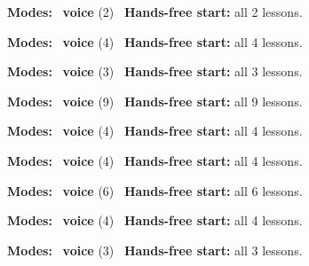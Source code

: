 \expandafter\def\csname hlchaptermodality15\endcsname{%
  {\small\noindent
    \textbf{Modes:} \hlvoicesign{}~\textbf{voice} (2)\quad
    \hlvoicesign{}~\textbf{Hands-free start:} all 2 lessons.%
    \par}\medskip
}

\expandafter\def\csname hlchaptermodality16\endcsname{%
  {\small\noindent
    \textbf{Modes:} \hlvoicesign{}~\textbf{voice} (4)\quad
    \hlvoicesign{}~\textbf{Hands-free start:} all 4 lessons.%
    \par}\medskip
}

\expandafter\def\csname hlchaptermodality17\endcsname{%
  {\small\noindent
    \textbf{Modes:} \hlvoicesign{}~\textbf{voice} (3)\quad
    \hlvoicesign{}~\textbf{Hands-free start:} all 3 lessons.%
    \par}\medskip
}

\expandafter\def\csname hlchaptermodality18\endcsname{%
  {\small\noindent
    \textbf{Modes:} \hlvoicesign{}~\textbf{voice} (9)\quad
    \hlvoicesign{}~\textbf{Hands-free start:} all 9 lessons.%
    \par}\medskip
}

\expandafter\def\csname hlchaptermodality19\endcsname{%
  {\small\noindent
    \textbf{Modes:} \hlvoicesign{}~\textbf{voice} (4)\quad
    \hlvoicesign{}~\textbf{Hands-free start:} all 4 lessons.%
    \par}\medskip
}

\expandafter\def\csname hlchaptermodality20\endcsname{%
  {\small\noindent
    \textbf{Modes:} \hlvoicesign{}~\textbf{voice} (4)\quad
    \hlvoicesign{}~\textbf{Hands-free start:} all 4 lessons.%
    \par}\medskip
}

\expandafter\def\csname hlchaptermodality21\endcsname{%
  {\small\noindent
    \textbf{Modes:} \hlvoicesign{}~\textbf{voice} (6)\quad
    \hlvoicesign{}~\textbf{Hands-free start:} all 6 lessons.%
    \par}\medskip
}

\expandafter\def\csname hlchaptermodality22\endcsname{%
  {\small\noindent
    \textbf{Modes:} \hlvoicesign{}~\textbf{voice} (4)\quad
    \hlvoicesign{}~\textbf{Hands-free start:} all 4 lessons.%
    \par}\medskip
}

\expandafter\def\csname hlchaptermodality23\endcsname{%
  {\small\noindent
    \textbf{Modes:} \hlvoicesign{}~\textbf{voice} (3)\quad
    \hlvoicesign{}~\textbf{Hands-free start:} all 3 lessons.%
    \par}\medskip
}

